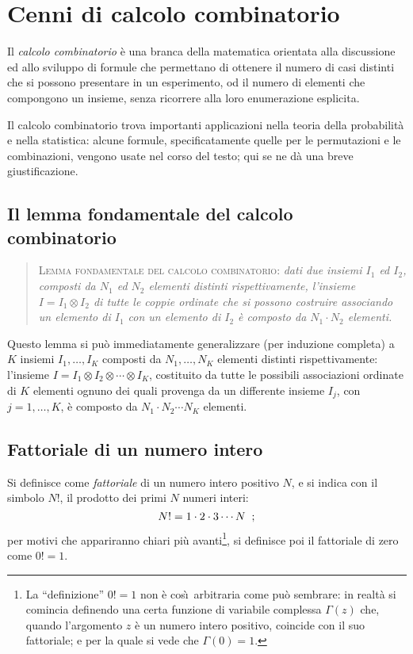 
\chapter{Cenni di calcolo combinatorio}%
Il \emph{calcolo combinatorio} \`e una branca della
matematica orientata alla discussione ed allo sviluppo di
formule che permettano di ottenere il numero di casi
distinti che si possono presentare in un esperimento, od il
numero di elementi che compongono un insieme, senza
ricorrere alla loro enumerazione esplicita.

Il calcolo combinatorio trova importanti applicazioni nella
teoria della probabilit\`a e nella statistica: alcune
formule, specificatamente quelle per le permutazioni e le
combinazioni, vengono usate nel corso del testo; qui se ne
d\`a una breve giustificazione.

\section{Il lemma fondamentale del calcolo combinatorio}%
\begin{quote}
  \textsc{Lemma fondamentale del calcolo combinatorio}:
  \textit{dati due insiemi $I_1$ ed $I_2$, composti da $N_1$
    ed $N_2$ elementi distinti rispettivamente, l'insieme $I
    = I_1 \otimes I_2$ di tutte le coppie ordinate che si
    possono costruire associando un elemento di $I_1$ con un
    elemento di $I_2$ \`e composto da $N_1 \cdot N_2$
    elementi.}
\end{quote}

Questo lemma si pu\`o immediatamente generalizzare (per
induzione completa) a $K$ insiemi $I_1,\ldots, I_K$ composti
da $N_1,\ldots, N_K$ elementi distinti rispettivamente:
l'insieme $I = I_1 \otimes I_2 \otimes \cdots \otimes I_K$,
costituito da tutte le possibili associazioni ordinate di
$K$ elementi ognuno dei quali provenga da un differente
insieme $I_j$, con $j=1,\ldots, K$, \`e composto da $N_1
\cdot N_2 \cdots N_K$ elementi.%

\section{Fattoriale di un numero intero}
Si definisce come \emph{fattoriale} di un numero intero
positivo $N$, e si indica con il simbolo $N!$, il prodotto
dei primi $N$ numeri interi:
\begin{equation*}
  N! = 1 \cdot 2 \cdot 3 \cdots N \;\; ;
\end{equation*}
per motivi che appariranno chiari pi\`u avanti\footnote{La
  ``definizione'' $0!  = 1$ non \`e cos\`\i\ arbitraria come
  pu\`o sembrare: in realt\`a si comincia definendo una
  certa funzione di variabile complessa $\Gamma(z)$ che,
  quando l'argomento $z$ \`e un numero intero positivo,
  coincide con il suo fattoriale; e per la quale si vede che
  $\Gamma(0) = 1$.}, si definisce poi il fattoriale di zero
come $0!  = 1$.

